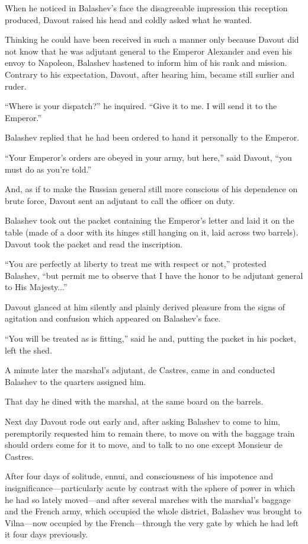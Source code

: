 When he noticed in Balashev's face the disagreeable impression
this reception produced, Davout raised his head and coldly asked
what he wanted.

Thinking he could have been received in such a manner only
because Davout did not know that he was adjutant general to the
Emperor Alexander and even his envoy to Napoleon, Balashev
hastened to inform him of his rank and mission. Contrary to his
expectation, Davout, after hearing him, became still surlier and
ruder.

``Where is your dispatch?'' he inquired. ``Give it to me. I will
send it to the Emperor.''

Balashev replied that he had been ordered to hand it personally
to the Emperor.

``Your Emperor's orders are obeyed in your army, but here,'' said
Davout, ``you must do as you're told.''

And, as if to make the Russian general still more conscious of
his dependence on brute force, Davout sent an adjutant to call
the officer on duty.

Balashev took out the packet containing the Emperor's letter and
laid it on the table (made of a door with its hinges still
hanging on it, laid across two barrels). Davout took the packet
and read the inscription.

``You are perfectly at liberty to treat me with respect or not,''
protested Balashev, ``but permit me to observe that I have the
honor to be adjutant general to His Majesty...''

Davout glanced at him silently and plainly derived pleasure from
the signs of agitation and confusion which appeared on Balashev's
face.

``You will be treated as is fitting,'' said he and, putting the
packet in his pocket, left the shed.

A minute later the marshal's adjutant, de Castres, came in and
conducted Balashev to the quarters assigned him.

That day he dined with the marshal, at the same board on the
barrels.

Next day Davout rode out early and, after asking Balashev to come
to him, peremptorily requested him to remain there, to move on
with the baggage train should orders come for it to move, and to
talk to no one except Monsieur de Castres.

After four days of solitude, ennui, and consciousness of his
impotence and insignificance---particularly acute by contrast
with the sphere of power in which he had so lately moved---and
after several marches with the marshal's baggage and the French
army, which occupied the whole district, Balashev was brought to
Vilna---now occupied by the French---through the very gate by
which he had left it four days previously.

